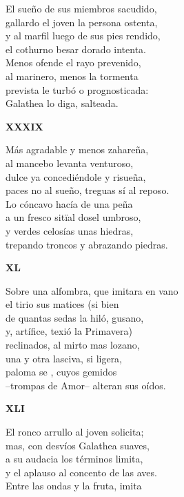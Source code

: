 \documentclass[11pt,twoside]{article}
\newcommand{\ch}{\emph{\textbf{Ch}}}
\newcommand{\guno}{\textbf{\emph{G}\textsuperscript{1}}}
\begin{document}
El sueño de sus miembros sacudido,\\
gallardo el joven la persona ostenta,\\
y al marfil luego de sus pies rendido,\\
el cothurno besar dorado intenta.\\
Menos ofende el rayo prevenido,\\
al marinero, menos la tormenta\\
prevista le turbó o prognosticada:\\
Galathea lo diga, salteada.\par\poend 
%
\begin{center}
	\textbf{XXXIX}
\end{center}\postart
Más agradable y menos zahareña,\\
al mancebo levanta venturoso,\\
dulce ya concediéndole y risueña,\\
paces no al sueño, treguas sí al reposo.\\
Lo cóncavo hacía de una peña\\
a un fresco sitïal dosel umbroso,\\
y verdes celosías unas hiedras,\\
trepando troncos y abrazando piedras.\par\poend
%
\begin{center}
	\textbf{XL}
\end{center}\postart
Sobre una alfombra, que imitara en vano\\
el tirio sus matices (si bien \footA{era}{ora {\ch}}\\
de quantas sedas la hiló, gusano,\\
y, artífice, texió la Primavera)\\
reclinados, al mirto mas lozano,\\
una y otra lasciva, si ligera,\\
paloma se \footA{caló}{callo {\guno}}, cuyos gemidos\\
--trompas de Amor-- alteran sus oídos.\par\poend
%
\begin{center}
	\textbf{XLI}
\end{center}\postart
El ronco arrullo al joven solicita;\\
mas, con desvíos Galathea suaves,\\
a su audacia los términos limita,\\
y el aplauso al concento de las aves.\\
Entre las ondas y la fruta, imita\\
\end{document}

